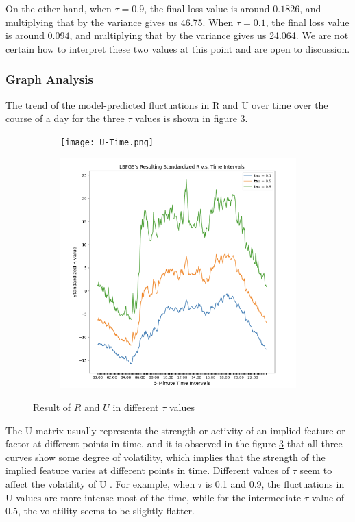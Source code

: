 \documentclass{article}
\begin{document}
On the other hand, when $\tau = 0.9$, the final loss value is around $0.1826$, and multiplying that by the variance gives us 46.75. When $\tau = 0.1$, the final loss value is around $0.094$, and multiplying that by the variance gives us 24.064. We are not certain how to interpret these two values at this point and are open to discussion. 

\subsubsection{Graph Analysis}
The trend of the model-predicted fluctuations in R and U over time over the course of a day for the three $\tau$ values is shown in figure \ref{fig:test}.
\clearpage
\begin{figure}[ht]
  \centering
  \begin{subfigure}[b]{0.45\textwidth}
    \texttt{[image: U-Time.png]}
    \label{pre-U}
  \end{subfigure}
  \hfill
  \begin{subfigure}[b]{0.48\textwidth}
    \includegraphics[width=\textwidth]{R-Time.png}
    \label{pre-R}
  \end{subfigure}
  \caption{Result of $R$ and $U$ in different $\tau$ values}
  \label{fig:test}
\end{figure}

The U-matrix usually represents the strength or activity of an implied feature or factor at different points in time, and it is observed in the figure \ref{fig:test} that all three curves show some degree of volatility, which implies that the strength of the implied feature varies at different points in time. Different values of $\tau$ seem to affect the volatility of U . For example, when $\tau$ is 0.1 and 0.9, the fluctuations in U values are more intense most of the time, while for the intermediate $\tau$ value of 0.5, the volatility seems to be slightly flatter.
\end{document}
